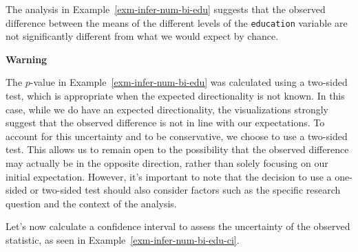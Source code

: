 \documentclass[
  letterpaper,
  krantz1]{latex/krantz-mod}
\theoremstyle{definition}
\theoremstyle{definition}
\theoremstyle{remark}
\begin{document}
The analysis in Example~\ref{exm-infer-num-bi-edu} suggests that the
observed difference between the means of the different levels of the
\texttt{education} variable are not significantly different from what we
would expect by chance.

\begin{tcolorbox}[enhanced jigsaw, toprule=.15mm, breakable, colback=white, arc=.35mm, left=2mm, colframe=quarto-callout-color-frame, opacityback=0, bottomrule=.15mm, rightrule=.15mm, leftrule=.75mm]

\textbf{ Warning}

The \(p\)-value in Example~\ref{exm-infer-num-bi-edu} was calculated
using a two-sided test, which is appropriate when
the expected directionality is not known. In this case, while we do have
an expected directionality, the visualizations strongly suggest that the
observed difference is not in line with our expectations. To account for
this uncertainty and to be conservative, we choose to use a two-sided
test. This allows us to remain open to the possibility that the observed
difference may actually be in the opposite direction, rather than solely
focusing on our initial expectation. However, it's important to note
that the decision to use a one-sided or two-sided
test should also consider factors such as the specific research question
and the context of the analysis.

\end{tcolorbox}

Let's now calculate a confidence interval to assess the uncertainty of
the observed statistic, as seen in
Example~\ref{exm-infer-num-bi-edu-ci}.
\end{document}
